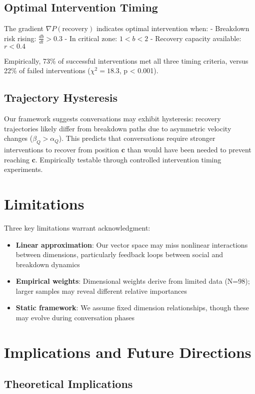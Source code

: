 \documentclass[11pt,letterpaper]{article}
\begin{document}
\subsection{Optimal Intervention Timing}

The gradient $\nabla P(\text{recovery})$ indicates optimal intervention when:
- Breakdown risk rising: $\frac{db}{dt} > 0.3$
- In critical zone: $1 < b < 2$
- Recovery capacity available: $r < 0.4$

Empirically, 73\% of successful interventions met all three timing criteria, versus 22\% of failed interventions ($\chi^2 = 18.3$, p < 0.001).

\subsection{Trajectory Hysteresis}

Our framework suggests conversations may exhibit hysteresis: recovery trajectories likely differ from breakdown paths due to asymmetric velocity changes ($\beta_Q > \alpha_Q$). This predicts that conversations require stronger interventions to recover from position $\mathbf{c}$ than would have been needed to prevent reaching $\mathbf{c}$. Empirically testable through controlled intervention timing experiments.

\section{Limitations}

Three key limitations warrant acknowledgment:
\begin{itemize}
    \item \textbf{Linear approximation}: Our vector space may miss nonlinear interactions between dimensions, particularly feedback loops between social and breakdown dynamics
    \item \textbf{Empirical weights}: Dimensional weights derive from limited data (N=98); larger samples may reveal different relative importances
    \item \textbf{Static framework}: We assume fixed dimension relationships, though these may evolve during conversation phases
\end{itemize}

\section{Implications and Future Directions}

\subsection{Theoretical Implications}
\end{document}
